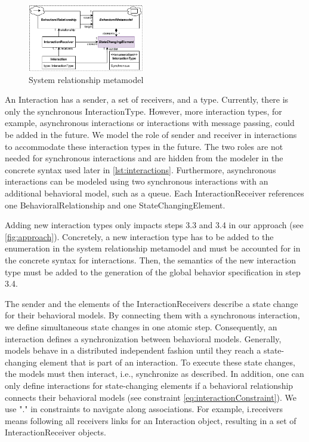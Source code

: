 \documentclass{jot}
\begin{document}
\begin{figure}[h]
    \centering
    \includegraphics[width=0.45\textwidth]{figures/srm_metamodel.pdf}
    \caption{System relationship metamodel}
    \label{fig:srm_metamodel}
\end{figure}

An \textsf{Interaction} has a \textsf{sender}, a set of \textsf{receivers}, and a \textsf{type}.
Currently, there is only the \textsf{synchronous} \textsf{InteractionType}.
However, more interaction types, for example, asynchronous interactions or interactions with message passing, could be added in the future.
We model the role of sender and receiver in interactions to accommodate these interaction types in the future.
The two roles are not needed for synchronous interactions and are hidden from the modeler in the concrete syntax used later in \cref{lst:interactions}.
Furthermore, asynchronous interactions can be modeled using two synchronous interactions with an additional behavioral model, such as a queue.
Each \textsf{InteractionReceiver} references one \textsf{BehavioralRelationship} and one \textsf{StateChangingElement}.

Adding new interaction types only impacts steps 3.3 and 3.4 in our approach (see \cref{fig:approach}).
Concretely, a new interaction type has to be added to the enumeration in the system relationship metamodel and must be accounted for in the concrete syntax for interactions.
Then, the semantics of the new interaction type must be added to the generation of the global behavior specification in step 3.4. 

The \textsf{sender} and the elements of the \textsf{InteractionReceiver}s describe a state change for their behavioral models.
By connecting them with a synchronous interaction, we define simultaneous state changes in one atomic step. 
Consequently, an interaction defines a synchronization between behavioral models.
Generally, models behave in a distributed independent fashion until they reach a state-changing element that is part of an interaction.
To execute these state changes, the models must then interact, i.e., synchronize as described.
In addition, one can only define interactions for state-changing elements if a behavioral relationship connects their behavioral models (see constraint \eqref{eq:interactionConstraint}).
We use "." in constraints to navigate along associations.
For example, \textsf{i.receivers} means following all \textsf{receivers} links for an \textsf{Interaction} object, resulting in a set of \textsf{InteractionReceiver} objects.
\end{document}
